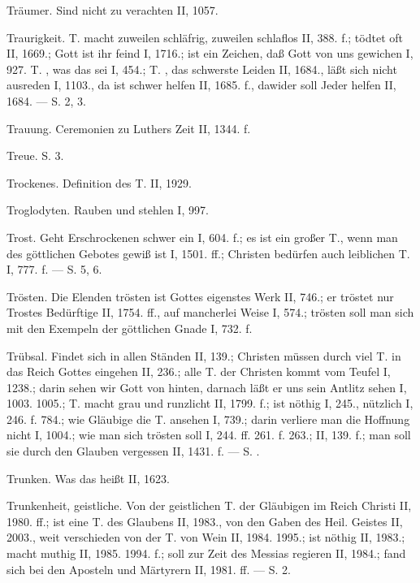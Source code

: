 Träumer. Sind nicht zu verachten II, 1057.

Traurigkeit. T. macht zuweilen schläfrig, zuweilen schlaflos II, 388. f.; tödtet oft II, 1669.; Gott ist ihr feind I, 1716.; ist ein Zeichen, daß Gott von uns gewichen I, 927. T. , was das sei I, 454.; T. , das schwerste Leiden II, 1684., läßt sich nicht ausreden I, 1103., da ist schwer helfen II, 1685. f., dawider soll Jeder helfen II, 1684. — S.  2, 3.

Trauung. Ceremonien zu Luthers Zeit II, 1344. f.

Treue. S.  3.

Trockenes. Definition des T. II, 1929.

Troglodyten. Rauben und stehlen I, 997.

Trost. Geht Erschrockenen schwer ein I, 604. f.; es ist ein großer T., wenn man des göttlichen Gebotes gewiß ist I, 1501. ff.; Christen bedürfen auch leiblichen T. I, 777. f. — S.  5,  6.

Trösten. Die Elenden trösten ist Gottes eigenstes Werk II, 746.; er tröstet nur Trostes Bedürftige II, 1754. ff., auf mancherlei Weise I, 574.; trösten soll man sich mit den Exempeln der göttlichen Gnade I, 732. f.

Trübsal. Findet sich in allen Ständen II, 139.; Christen müssen durch viel T. in das Reich Gottes eingehen II, 236.; alle T. der Christen kommt vom Teufel I, 1238.; darin sehen wir Gott von hinten, darnach läßt er uns sein Antlitz sehen I, 1003. 1005.; T. macht grau und runzlicht II, 1799. f.; ist nöthig I, 245., nützlich I, 246. f. 784.; wie Gläubige die T. ansehen I, 739.; darin verliere man die Hoffnung nicht I, 1004.; wie man sich trösten soll I, 244. ff. 261. f. 263.; II, 139. f.; man soll sie durch den Glauben vergessen II, 1431. f. — S. .

Trunken. Was das heißt II, 1623.

Trunkenheit, geistliche. Von der geistlichen T. der Gläubigen im Reich Christi II, 1980. ff.; ist eine T. des Glaubens II, 1983., von den Gaben des Heil. Geistes II, 2003., weit verschieden von der T. von Wein II, 1984. 1995.; ist nöthig II, 1983.; macht muthig II, 1985. 1994. f.; soll zur Zeit des Messias regieren II, 1984.; fand sich bei den Aposteln und Märtyrern II, 1981. ff. — S.  2.

